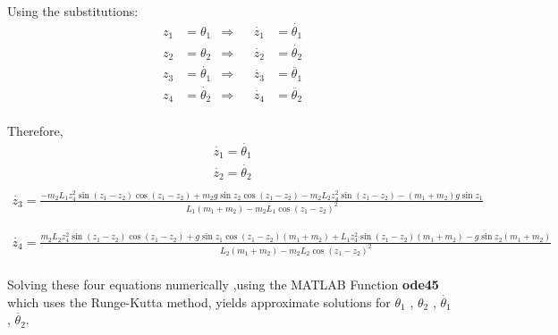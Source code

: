 \documentclass[11]{article}
\begin{document}
\noindent Using the substitutions:
\begin{align}
z_{1} &=\theta_{1} &\Rightarrow& &\dot{z_{1}}&=\dot{\theta_{1}}\\
z_{2}&=\theta_{2} &\Rightarrow& &\dot{z_{2}}&=\dot{\theta_{2}}\\
z_{3}&=\dot{\theta_{1}} &\Rightarrow& &\dot{z_{3}}&=\ddot{\theta_{1}}\\
z_{4}&=\dot{\theta_{2}} &\Rightarrow& &\dot{z_{4}}&=\ddot{\theta_{2}}
\end{align}
\\
Therefore, 
\begin{align}
\dot{z_{1}}=\dot{\theta_{1}}\\
\dot{z_{2}}=\dot{\theta_{2}}\\
\end{align}
\begin{align}
\dot{z_{3}}=\frac{-m_{2}L_{1}z_{4}^{2}\sin(z_{1}-z_{2})\cos(z_{1}-z_{2})+m_{2}g\sin z_{2}\cos(z_{1}-z_{2})-m_{2}L_{2}z_{4}^{2}\sin(z_{1}-z_{2})-(m_{1}+m_{2})g\sin z_{1}}{L_{1}(m_{1}+m_{2})-m_{2}L_{1}\cos(z_{1}-z_{2})^2}
\end{align}

\begin{align}
\dot{z_{4}}=\frac{m_{2}L_{2}z_{4}^{2}\sin(z_{1}-z_{2})\cos(z_{1}-z_{2})+g\sin z_{1} \cos(z_{1}-z_{2})(m_{1}+m_{2})+L_{1}z_{4}^{2}\sin(z_{1}-z_{2})(m_{1}+m_{2})-g\sin z_{2}(m_{1}+m_{2})}{L_{2}(m_{1}+m_{2})-m_{2}L_{2}\cos(z_{1}-z_{2})^{2}}
\end{align}
\\

\noindent Solving these four equations numerically ,using the MATLAB Function \textbf{ode45} which uses the Runge-Kutta method, yields approximate solutions for $\theta_{1}$ , $\theta_{2}$ , $\dot{\theta_{1}}$ , $\dot{\theta_{2}}$.
\end{document}
